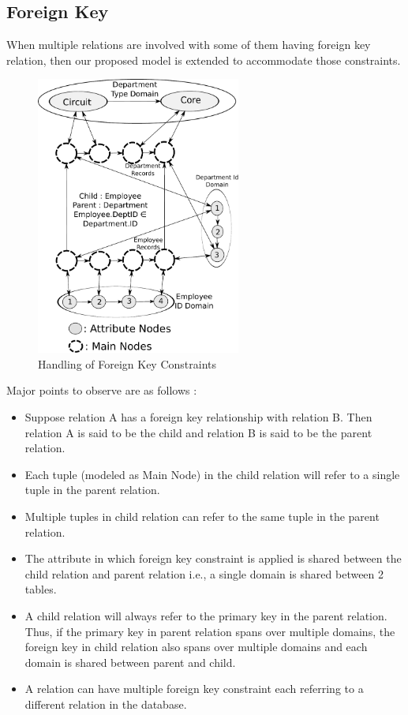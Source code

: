 \documentclass[12pt, oneside]{book}
\begin{document}
\subsection{Foreign Key}
When multiple relations are involved with some of them having foreign key relation, then our proposed model is extended to accommodate those constraints.
\begin{figure}[h]
 \centering
 \includegraphics[width=0.6\textwidth]{pics/foreign_key.pdf}
 \caption{Handling of Foreign Key Constraints}
 \label{fig:foreign_key}
\end{figure}
Major points to observe are as follows :
\begin{itemize}
 \item Suppose relation A has a foreign key relationship with relation B. Then relation A is said to be the child and relation B is said to be the parent relation.
 \item Each tuple (modeled as Main Node) in the child relation will refer to a single tuple in the parent relation.
 \item Multiple tuples in child relation can refer to the same tuple in the parent relation.
 \item The attribute in which foreign key constraint is applied is shared between the child relation and parent relation i.e., a single domain is shared between 2
 tables.
 \item A child relation will always refer to the primary key in the parent relation. Thus, if the primary key in parent relation spans over multiple domains, the foreign key in child relation also spans over multiple domains and each domain is shared between parent and child.
 \item A relation can have multiple foreign key constraint each referring to a different relation in the database.
\end{itemize}
\end{document}
